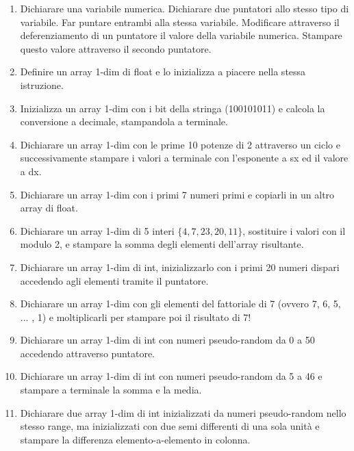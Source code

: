 \documentclass{article}
\begin{document}
\begin{enumerate}

\item Dichiarare una variabile numerica. Dichiarare due puntatori allo stesso tipo di variabile. Far puntare entrambi alla stessa variabile. Modificare attraverso il deferenziamento di un puntatore il valore della variabile numerica. Stampare questo valore attraverso il secondo puntatore.

\item Definire un array 1-dim di float e lo inizializza a piacere nella stessa istruzione.

\item Inizializza un array 1-dim con i bit della stringa (100101011) e calcola la conversione a decimale, stampandola a terminale.

\item Dichiarare un array 1-dim con le prime 10 potenze di 2 attraverso un ciclo e successivamente stampare i valori a terminale con l'esponente a sx ed il valore a dx.

\item Dichiarare un array 1-dim con i primi 7 numeri primi e copiarli in un altro array di float.

\item Dichiarare un array 1-dim di 5 interi $\{4, 7, 23, 20, 11\}$, sostituire i valori con il modulo 2, e stampare la somma degli elementi dell'array risultante.

\item Dichiarare un array 1-dim di int, inizializzarlo con i primi 20 numeri dispari accedendo agli elementi tramite il puntatore.

\item Dichiarare un array 1-dim con gli elementi del fattoriale di 7 (ovvero 7, 6, 5, ... , 1) e moltiplicarli per stampare poi il risultato di 7!

\item Dichiarare un array 1-dim di int con numeri pseudo-random da 0 a 50 accedendo attraverso puntatore.

\item Dichiarare un array 1-dim di int con numeri pseudo-random da 5 a 46 e stampare a terminale la somma e la media.

\item Dichiarare due array 1-dim di int inizializzati da numeri pseudo-random nello stesso range, ma inizializzati con due semi differenti di una sola unità e stampare la differenza elemento-a-elemento in colonna.


\end{enumerate}
\end{document}
